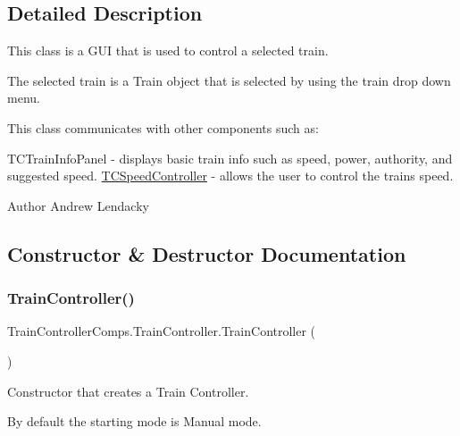\subsection{Detailed Description}
This class is a G\+UI that is used to control a selected train. 

The selected train is a Train object that is selected by using the train drop down menu.

This class communicates with other components such as\+:

T\+C\+Train\+Info\+Panel -\/ displays basic train info such as speed, power, authority, and suggested speed. \hyperlink{classTrainControllerComps_1_1TCSpeedController}{T\+C\+Speed\+Controller} -\/ allows the user to control the train\textquotesingle{}s speed.

\begin{DoxyAuthor}{Author}
Andrew Lendacky 
\end{DoxyAuthor}


\subsection{Constructor \& Destructor Documentation}
\mbox{\label{classTrainControllerComps_1_1TrainController_ad8203c295c6057d7b33da675227cd861}} 
\subsubsection{\texorpdfstring{Train\+Controller()}{TrainController()}\hspace{0.1cm}{\footnotesize\ttfamily [1/4]}}
{\footnotesize\ttfamily Train\+Controller\+Comps.\+Train\+Controller.\+Train\+Controller (\begin{DoxyParamCaption}{ }\end{DoxyParamCaption})}



Constructor that creates a Train Controller. 

By default the starting mode is \textquotesingle{}Manual\textquotesingle{} mode. \mbox{\label{classTrainControllerComps_1_1TrainController_a3344359acd0fcf8829763360fbe0a68a}} 
